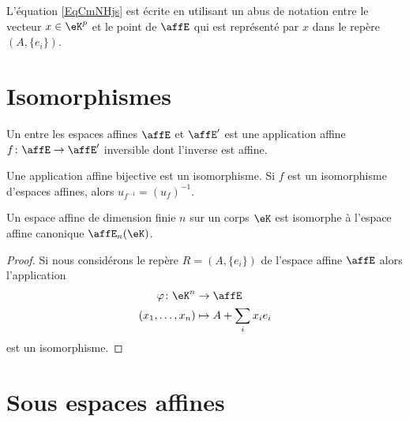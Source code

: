 \begin{remark}
	L'équation \eqref{EqCmNHjs} est écrite en utilisant un abus de notation entre le vecteur \( x\in \eK^p\) et le point de \( \affE\) qui est représenté par \( x\) dans le repère \( (A,\{ e_i \})\).
\end{remark}

\section{Isomorphismes}

\begin{definition}
	Un  entre les espaces affines \( \affE\) et \( \affE'\) est une application affine \( f\colon \affE\to \affE'\) inversible dont l'inverse est affine.
\end{definition}

\begin{proposition} \label{PropxtFeDE}
	Une application affine bijective est un isomorphisme. Si \( f\) est un isomorphisme d'espaces affines, alors \( u_{f^{-1}}=(u_f)^{-1}\).
\end{proposition}

\begin{proposition}
	Un espace affine de dimension finie \( n\) sur un corps \( \eK\) est isomorphe à l'espace affine canonique \( \affE_n(\eK)\).
\end{proposition}

\begin{proof}
	Si nous considérons le repère \( R=(A,\{ e_i \})\) de l'espace affine \( \affE\) alors l'application
	\begin{equation}
		\begin{aligned}
			\varphi\colon \eK^n & \to \affE              \\
			(x_1,\ldots,x_n)    & \mapsto A+\sum_ix_ie_i
		\end{aligned}
	\end{equation}
	est un isomorphisme.
\end{proof}

\section{Sous espaces affines}

